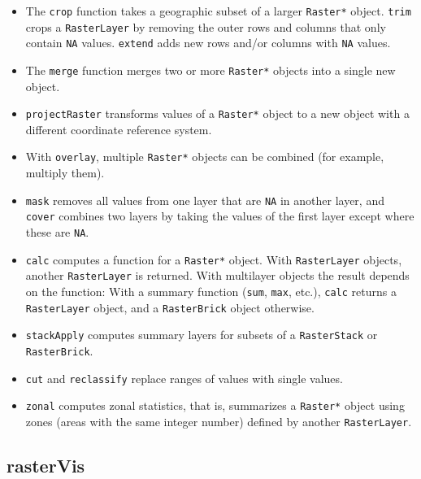 \documentclass[smallroyalvopaper]{memoir}
\begin{document}
\begin{itemize}
\item The \texttt{crop} function takes a geographic subset of a larger \texttt{Raster*} object. \texttt{trim} crops a \texttt{RasterLayer} by removing the outer rows and columns that only contain \texttt{NA} values. \texttt{extend} adds new rows and/or columns with \texttt{NA} values.

\item The \texttt{merge} function merges two or more \texttt{Raster*} objects into a single new object.

\item \texttt{projectRaster} transforms values of a \texttt{Raster*} object to a new object with a different coordinate reference system.

\item With \texttt{overlay}, multiple \texttt{Raster*} objects can be combined (for example, multiply them).

\item \texttt{mask} removes all values from one layer that are \texttt{NA} in another layer, and \texttt{cover} combines two layers by taking the values of the first layer except where these are \texttt{NA}.

\item \texttt{calc} computes a function for a \texttt{Raster*} object. With \texttt{RasterLayer} objects, another \texttt{RasterLayer} is returned. With multilayer objects the result depends on the function: With a summary function (\texttt{sum}, \texttt{max}, etc.), \texttt{calc} returns a \texttt{RasterLayer} object, and a \texttt{RasterBrick} object otherwise.

\item \texttt{stackApply} computes summary layers for subsets of a \texttt{RasterStack} or \texttt{RasterBrick}.

\item \texttt{cut} and \texttt{reclassify} replace ranges of values with single values.

\item \texttt{zonal} computes zonal statistics, that is, summarizes a \texttt{Raster*} object using zones (areas with the same integer number) defined by another \texttt{RasterLayer}.
\end{itemize}

\subsection{rasterVis}
\label{sec:orgheadline26}
\label{sec:rasterVis}
\end{document}
